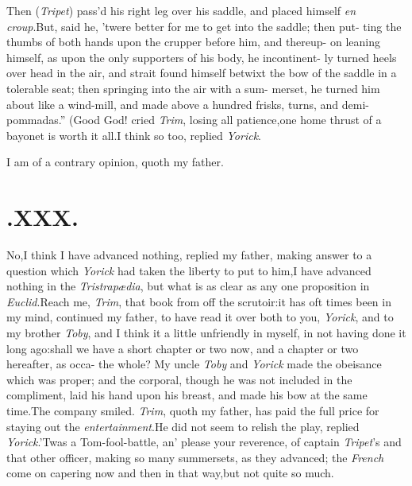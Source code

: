 \documentclass{article}
\begin{document}
\lqq Then (\textit{Tripet}) pass’d his right leg\break
\lqq over his saddle, and placed himself \textit{en}\break
\lqq \textit{croup}.\tsk But, said he, ’twere better for\break
\lqq me to get into the saddle; then put-\break
\lqq ting the thumbs of both hands upon\break
\lqq the crupper before him, and thereup-
\lqq on leaning himself, as upon the only\break
\lqq supporters of his body, he incontinent-\break
\lqq ly turned heels over head in the air,\break
\lqq and strait found himself betwixt the\break
\lqq bow of the saddle in a tolerable seat;\break
\lqq then springing into the air with a sum-\break
\lqq merset, he turned him about like a\break
\lqq wind-mill, and made above a hundred\break
\lqq frisks, turns, and demi-pommadas.”\tsh\break
(Good God! cried \textit{Trim}, losing all patience,\tsk one home thrust of a
bayonet is worth it all.\tsh I think so too, replied \textit{Yorick}.\tsh

\tsk I am of a contrary opinion, quoth my father.

\section{.\enspace  XXX.}

\quad \tsh  No,\tsk I think I have advanced\break
nothing, replied my father, making\break
answer to a question which \textit{Yorick} had\break
taken the liberty to put to him,\tsh I have
advanced nothing in the \textit{Tristrapædia},\break 
but what is as clear as any one proposi\-tion in \textit{Euclid}.\tsk Reach me,
\textit{Trim}, that book from off the scrutoir:\tsh it has
oft times been in my mind, continued my father, to have read it
over both to you, \textit{Yorick}, and to my brother \textit{Toby}, and
I think it a little unfriendly in myself, in not having done it
long ago:\tsh shall we have a short chapter or two
now,\tsk\break 
and a chapter or two hereafter, as occa-\break
{}
the whole? My uncle \textit{Toby} and \textit{Yorick} made the obeisance
which was proper; and the corporal, though he was not included in
the compliment, laid his hand upon his breast, and made his bow at
the same time.\tsh The company smiled.\break
\textit{Trim}, quoth
my father, has paid the\break
full price for staying out the \textit{entertain\-ment}.\tsh He did not seem to relish the\break
play, replied \textit{Yorick}.\tsh ’Twas a
Tom-\break fool-battle, an’ please your reverence, of captain
\textit{Tripet}’s and that other officer,\break
making so many summersets, as they advanced;\tsh
the \textit{French} come on capering now and then
in that way,\tsk but not quite so much.
\end{document}

